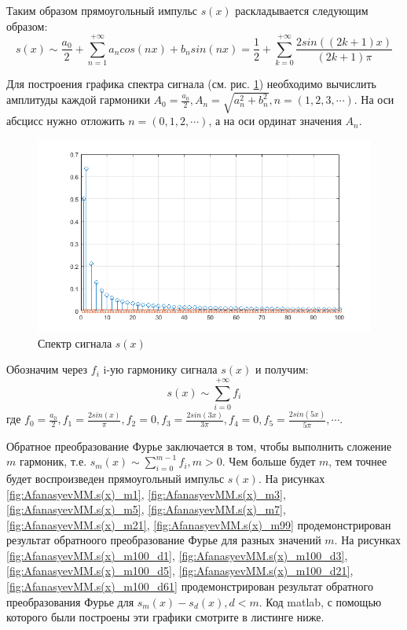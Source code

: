 Таким образом прямоугольный импульс $s(x)$ раскладывается следующим образом:
$$
s(x) \sim \frac{a_0}{2} + \sum_{n=1}^{+ \infty}{a_n cos(n x) + b_n sin(n x)}=
\frac{1}{2} + \sum_{k=0}^{+ \infty}{ \frac{2 sin((2 k + 1) x)}{(2 k + 1) \pi}}
$$

Для построения графика спектра сигнала (см. рис. \ref{fig:AfanasyevMM.spectrum})
необходимо вычислить амплитуды каждой гармоники $A_0= \frac{a_0}{2},
A_n= \sqrt{a_n^2+b_n^2}, n=(1,2,3, \cdots)$.
На оси абсцисс нужно отложить $n=(0,1,2, \cdots)$, а на оси ординат значения $A_n$.


\begin{figure}[h]
	\centering
	\includegraphics[width=0.9\linewidth]{AfanasyevMM/img/spectrum}
	\caption{Спектр сигнала $s(x)$}
	\label{fig:AfanasyevMM.spectrum}
\end{figure}


Обозначим через $f_i$ i-ую гармонику сигнала $s(x)$ и получим:
$$
s(x) \sim \sum_{i=0}^{+ \infty}{f_i}
$$
где $f_0= \frac{a_0}{2},
f_1= \frac{2 sin(x)}{ \pi},
f_2= 0,
f_3= \frac{2 sin(3 x)}{3 \pi},
f_4= 0,
f_5= \frac{2 sin(5 x)}{5 \pi},
\cdots$.

Обратное преобразование Фурье заключается в том, чтобы выполнить 
сложение $m$ гармоник, т.е. $s_{m}(x) \sim \sum_{i=0}^{m - 1}{f_i}, m > 0$.
Чем больше будет $m$, тем точнее будет воспроизведен прямоугольный
импульс $s(x)$.
На рисунках
\ref{fig:AfanasyevMM.s(x)_m1}, 
\ref{fig:AfanasyevMM.s(x)_m3},
\ref{fig:AfanasyevMM.s(x)_m5},
\ref{fig:AfanasyevMM.s(x)_m7},
\ref{fig:AfanasyevMM.s(x)_m21},
\ref{fig:AfanasyevMM.s(x)_m99}
продемонстрирован результат обратноого преобразование Фурье для разных
значений $m$.
На рисунках
\ref{fig:AfanasyevMM.s(x)_m100_d1}, 
\ref{fig:AfanasyevMM.s(x)_m100_d3},
\ref{fig:AfanasyevMM.s(x)_m100_d5},
\ref{fig:AfanasyevMM.s(x)_m100_d21},
\ref{fig:AfanasyevMM.s(x)_m100_d61}
продемонстрирован результат обратного преобразования Фурье для
$s_{m}(x) - s_{d}(x), d < m$. Код matlab, с помощью которого
были построены эти графики смотрите в листинге ниже.


